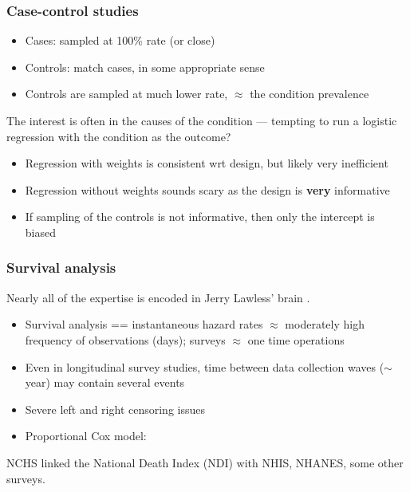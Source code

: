 \documentclass{beamer}
\begin{document}
\begin{frame}\frametitle{Case-control studies}

\begin{itemize}
    \item Cases: sampled at 100\% rate (or close)
    \item Controls: match cases, in some appropriate sense
    \item Controls are sampled at much lower rate, $\approx$ the condition prevalence
\end{itemize}

The interest is often in the causes of the condition --- tempting to run a logistic
regression with the condition as the outcome?

\begin{itemize}
    \item Regression with weights is consistent wrt design, but likely very inefficient
    \item Regression without weights sounds scary as the design is \textbf{very} informative
    \item If sampling of the controls is not informative, then only the intercept is biased
        \citep{scott:wild:2003}
\end{itemize}

\end{frame}

\begin{frame}\frametitle{Survival analysis}

Nearly all of the expertise is encoded in Jerry Lawless' brain
\citep{lawless:2003}.

\begin{itemize}
    \item Survival analysis == instantaneous hazard rates 
            $\approx$ moderately high frequency
            of observations (days); surveys $\approx$ one time operations
    \item Even in longitudinal survey studies, time between data collection
          waves ($\sim$year) may contain several events
    \item Severe left and right censoring issues
    \item Proportional Cox model: \citet{binder:1992}
\end{itemize}

NCHS linked the National Death Index (NDI) with NHIS, NHANES, 
some other surveys.

\end{frame}
\end{document}
